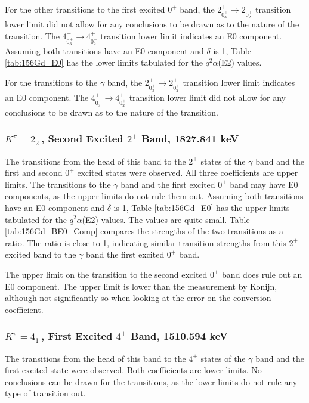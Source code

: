 \afterpage{}

For the other transitions to the first excited $0^+$ band, the $2^+_{0^+_3}\rightarrow 2^+_{0^+_2}$ transition lower limit did not allow for any conclusions to be drawn as to the nature of the transition. The $4^+_{0^+_3}\rightarrow 4^+_{0^+_2}$ transition lower limit indicates an E0 component. Assuming both transitions have an E0 component and $\delta$ is 1, Table \ref{tab:156Gd_E0} has the lower limits tabulated for the $q^2\alpha$(E2) values.

For the transitions to the $\gamma$ band, the $2^+_{0^+_3}\rightarrow 2^+_{0^+_2}$ transition lower limit indicates an E0 component. The $4^+_{0^+_3}\rightarrow 4^+_{0^+_2}$ transition lower limit did not allow for any conclusions to be drawn as to the nature of the transition.

\subsubsection{$K^{\pi}=2^+_2$, Second Excited $2^+$ Band, 1827.841 keV}

The transitions from the head of this band to the $2^+$ states of the $\gamma$ band and the first and second $0^+$ excited states were observed. All three coefficients are upper limits. The transitions to the $\gamma$ band and the first excited $0^+$ band may have E0 components, as the upper limits do not rule them out. Assuming both transitions have an E0 component and $\delta$ is 1, Table \ref{tab:156Gd_E0} has the upper limits tabulated for the $q^2\alpha$(E2) values. The values are quite small. Table \ref{tab:156Gd_BE0_Comp} compares the strengths of the two transitions as a ratio. The ratio is close to 1, indicating similar transition strengths from this $2^+$ excited band to the $\gamma$ band the first excited $0^+$ band.

The upper limit on the transition to the second excited $0^+$ band does rule out an E0 component. The upper limit is lower than the measurement by Konijn, although not significantly so when looking at the error on the conversion coefficient\citep{konijn81:_156gd}.

\subsubsection{$K^{\pi}=4^+_1$, First Excited $4^+$ Band, 1510.594 keV}

The transitions from the head of this band to the $4^+$ states of the $\gamma$ band and the first excited state were observed. Both coefficients are lower limits. No conclusions can be drawn for the transitions, as the lower limits do not rule any type of transition out.